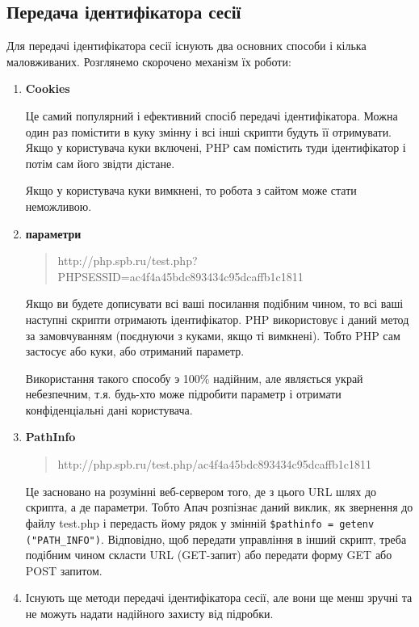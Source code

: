 \subsection*{Передача ідентифікатора сесії}
Для передачі ідентифікатора сесії існують два основних способи і кілька маловживаних. Розглянемо скорочено механізм їх роботи:

\begin{enumerate}
\item \textbf{Cookies}

Це самий популярний і ефективний спосіб передачі ідентифікатора. Можна один раз помістити в куку змінну і всі інші скрипти будуть її отримувати. Якщо у користувача куки включені, PHP сам помістить туди ідентифікатор і потім сам його звідти дістане. 

Якщо у користувача куки вимкнені, то робота з сайтом може стати неможливою.

\item \textbf{параметри}
\begin{verse}
http://php.spb.ru/test.php?PHPSESSID=ac4f4a45bdc893434c95dcaffb1c1811
\end{verse}

Якщо ви будете дописувати всі ваші посилання подібним чином, то всі ваші наступні скрипти отримають ідентифікатор. PHP використовує і даний метод за замовчуванням (поєднуючи з куками, якщо ті вимкнені). Тобто PHP сам застосує або куки, або отриманий параметр.

Використання такого способу э 100\% надійним, але являється украй небезпечним, т.я. будь-хто може підробити параметр і отримати конфіденціальні дані користувача.

\item \textbf{PathInfo}
\begin{verse}
http://php.spb.ru/test.php/ac4f4a45bdc893434c95dcaffb1c1811
\end{verse}

Це засновано на розумінні веб-сервером того, де з цього URL шлях до скрипта, а де параметри. Тобто Апач розпізнає даний виклик, як звернення до файлу test.php і передасть йому рядок у змінній \verb'$pathinfo = getenv ("PATH_INFO")'. Відповідно, щоб передати управління в інший скрипт, треба подібним чином скласти URL (GET-запит) або передати форму GET або POST запитом.

\item Існують ще методи передачі ідентифікатора сесії, але вони ще менш зручні та не можуть надати надійного захисту від підробки.

\end{enumerate}



